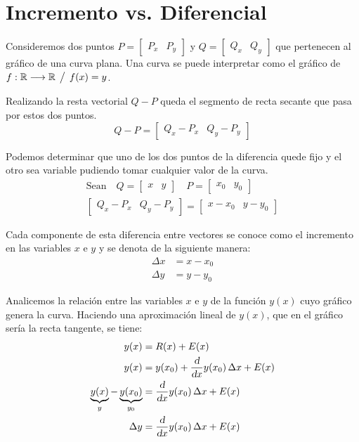\section{Incremento vs. Diferencial}

Consideremos dos puntos $P=\begin{bmatrix} P_x & P_y \end{bmatrix}$ y $Q=\begin{bmatrix} Q_x & Q_y \end{bmatrix}$ que pertenecen al gráfico de una curva plana.
Una curva se puede interpretar como el gráfico de $f:\mathbb{R} \longrightarrow \mathbb{R} \hspace{1ex} \big/ \hspace{1ex} f(x)=y$.

Realizando la resta vectorial $Q-P$ queda el segmento de recta secante que pasa por estos dos puntos.
\begin{equation*}
    Q-P = \begin{bmatrix} Q_x-P_x & Q_y-P_y \end{bmatrix}
\end{equation*}

Podemos determinar que uno de los dos puntos de la diferencia quede fijo y el otro sea variable pudiendo tomar cualquier valor de la curva.
\begin{gather*}
    \textrm{Sean} \quad
    Q = \begin{bmatrix}x&y\end{bmatrix} \quad P = \begin{bmatrix}x_0&y_0\end{bmatrix}
    \\
    \begin{bmatrix}Q_x-P_x & Q_y-P_y\end{bmatrix} = \begin{bmatrix}x-x_0 & y-y_0\end{bmatrix}
\end{gather*}

Cada componente de esta diferencia entre vectores se conoce como el incremento en las variables $x$ e $y$ y se denota de la siguiente manera:
\begin{align*}
    \Delta x &= x-x_0
    \\
    \Delta y &= y-y_0
\end{align*}

Analicemos la relación entre las variables $x$ e $y$ de la función $y(x)$ cuyo gráfico genera la curva.
Haciendo una aproximación lineal de $y(x)$, que en el gráfico sería la recta tangente, se tiene:
\begin{align*}
    y(x) &= R(x)+E(x)
    \\
    y(x) &= y(x_0) + \frac{\textsl{d}}{\textsl{d} x} y(x_0) \, \Delta x +E(x)
    \\
    \underbrace{y(x)}_y - \underbrace{y(x_0)}_{y_0} &= \frac{\textsl{d}}{\textsl{d} x} y(x_0) \, \Delta x +E(x)
    \\
    \Delta y &= \frac{\textsl{d}}{\textsl{d} x} y(x_0) \, \Delta x +E(x)
\end{align*}

